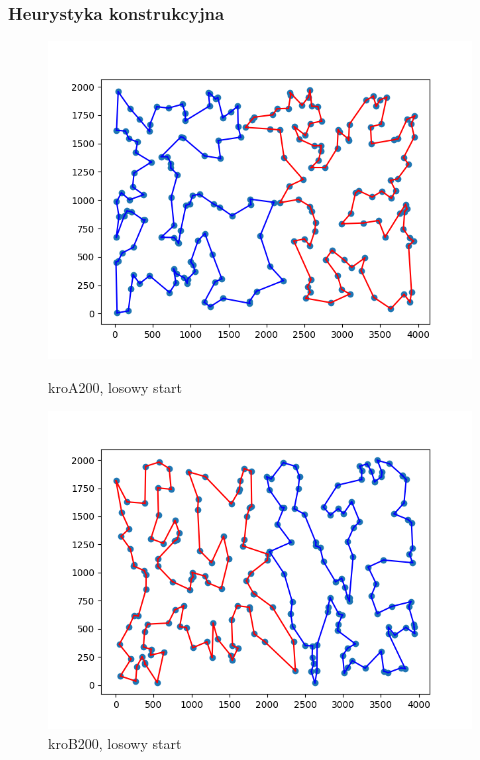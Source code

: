 \documentclass[11pt]{article}
\begin{document}
\subsubsection{Heurystyka konstrukcyjna}\label{subsubsec:heurystyka-konstrukcyjna}

\begin{figure}[H]
    \begin{minipage}[t]{0.45\textwidth}
        \centering
        \includegraphics[width=\linewidth]{best_paths/kroA200/split_paths_regret_TSP}
        \caption{kroA200, losowy start}
    \end{minipage}
    \hfill
    \begin{minipage}[t]{0.45\textwidth}
        \centering
        \includegraphics[width=\linewidth]{best_paths/kroB200/split_paths_regret_TSP}
        \caption{kroB200, losowy start}
    \end{minipage}\label{fig:figure4}
\end{figure}
\end{document}
